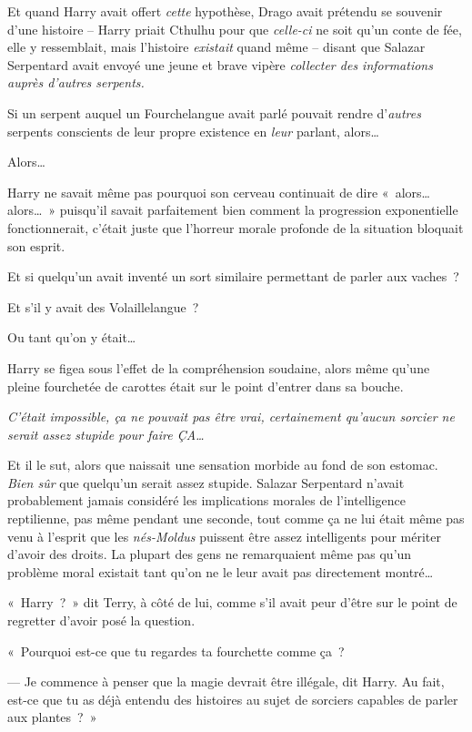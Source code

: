Et quand Harry avait offert \emph{cette} hypothèse, Drago avait prétendu se souvenir d'une histoire -- Harry priait Cthulhu pour que \emph{celle-ci} ne soit qu'un conte de fée, elle y ressemblait, mais l'histoire \emph{existait} quand même -- disant que Salazar Serpentard avait envoyé une jeune et brave vipère \emph{collecter des informations auprès d'autres serpents.}

Si un serpent auquel un Fourchelangue avait parlé pouvait rendre d'\emph{autres} serpents conscients de leur propre existence en \emph{leur} parlant, alors…

Alors…

Harry ne savait même pas pourquoi son cerveau continuait de dire «~alors… alors…~» puisqu'il savait parfaitement bien comment la progression exponentielle fonctionnerait, c'était juste que l'horreur morale profonde de la situation bloquait son esprit.

Et si quelqu'un avait inventé un sort similaire permettant de parler aux vaches~?

Et s'il y avait des Volaillelangue~?

Ou tant qu'on y était…

Harry se figea sous l'effet de la compréhension soudaine, alors même qu'une pleine fourchetée de carottes était sur le point d'entrer dans sa bouche.

\emph{C'était impossible, ça ne pouvait pas être vrai, certainement qu'aucun sorcier ne serait assez stupide pour faire ÇA…}

Et il le sut, alors que naissait une sensation morbide au fond de son estomac. \emph{Bien sûr} que quelqu'un serait assez stupide. Salazar Serpentard n'avait probablement jamais considéré les implications morales de l'intelligence reptilienne, pas même pendant une seconde, tout comme ça ne lui était même pas venu à l'esprit que les \emph{nés-Moldus} puissent être assez intelligents pour mériter d'avoir des droits. La plupart des gens ne remarquaient même pas qu'un problème moral existait tant qu'on ne le leur avait pas directement montré…

«~Harry~?~» dit Terry, à côté de lui, comme s'il avait peur d'être sur le point de regretter d'avoir posé la question.

«~Pourquoi est-ce que tu regardes ta fourchette comme ça~?

--- Je commence à penser que la magie devrait être illégale, dit Harry. Au fait, est-ce que tu as déjà entendu des histoires au sujet de sorciers capables de parler aux plantes~?~»

